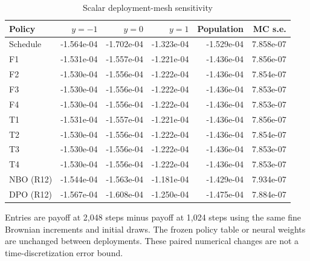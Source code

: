 \begin{table}[!htbp]
\centering\small
\caption{Scalar deployment-mesh sensitivity}
\label{tab:r15scalartime}
\begin{tabular}{lrrrrr}
\toprule
Policy & $y=-1$ & $y=0$ & $y=1$ & Population & MC s.e. \\
\midrule
Schedule & -1.564e-04 & -1.702e-04 & -1.323e-04 & -1.529e-04 & 7.858e-07 \\
F1 & -1.531e-04 & -1.557e-04 & -1.221e-04 & -1.436e-04 & 7.856e-07 \\
F2 & -1.530e-04 & -1.556e-04 & -1.222e-04 & -1.436e-04 & 7.854e-07 \\
F3 & -1.530e-04 & -1.556e-04 & -1.222e-04 & -1.436e-04 & 7.853e-07 \\
F4 & -1.530e-04 & -1.556e-04 & -1.222e-04 & -1.436e-04 & 7.853e-07 \\
T1 & -1.531e-04 & -1.557e-04 & -1.221e-04 & -1.436e-04 & 7.856e-07 \\
T2 & -1.530e-04 & -1.556e-04 & -1.222e-04 & -1.436e-04 & 7.854e-07 \\
T3 & -1.530e-04 & -1.556e-04 & -1.222e-04 & -1.436e-04 & 7.853e-07 \\
T4 & -1.530e-04 & -1.556e-04 & -1.222e-04 & -1.436e-04 & 7.853e-07 \\
NBO (R12) & -1.544e-04 & -1.563e-04 & -1.181e-04 & -1.429e-04 & 7.934e-07 \\
DPO (R12) & -1.567e-04 & -1.608e-04 & -1.250e-04 & -1.475e-04 & 7.884e-07 \\
\bottomrule
\end{tabular}
\par\medskip\noindent\footnotesize Entries are payoff at 2,048 steps minus payoff at 1,024 steps using the same fine Brownian increments and initial draws. The frozen policy table or neural weights are unchanged between deployments. These paired numerical changes are not a time-discretization error bound.
\end{table}
